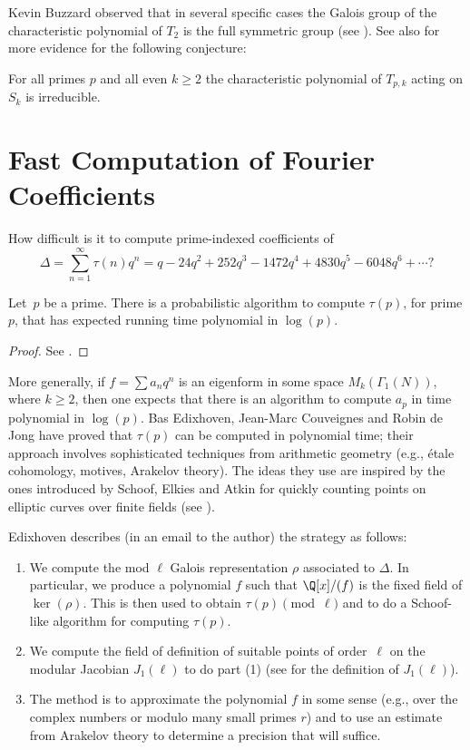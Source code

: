 Kevin Buzzard observed that in several specific cases the Galois group of
the characteristic polynomial of $T_2$ is the full symmetric group
(see \cite{buzzard:t2}).  See also \cite{farmer-james:maeda} for more
evidence for the following conjecture:
\begin{conjecture}
For all primes $p$ and all even $k\geq 2$
the characteristic polynomial of $T_{p,k}$ acting
on $S_k$ is irreducible.
\end{conjecture}



\section{Fast Computation of Fourier Coefficients}\label{sec:fasttau}

How difficult is it to compute prime-indexed coefficients of 
$$
 \Delta = \sum_{n=1}^{\infty} \tau(n) q^n 
   = q - 24q^2 + 252q^3 - 1472q^4 + 4830q^5 - 6048q^6 + \cdots?
$$

\begin{theorem}\label{conj:edixhoven}
  Let~$p$ be a prime.  There is a probabilistic algorithm to compute
  $\tau(p)$, for prime $p$, that has expected running time polynomial
  in $\log(p)$.
\end{theorem}
\begin{proof}
See \cite{edix:tau}.
\end{proof}

More generally, if $f=\sum a_n q^n$ is an eigenform in some space
$M_k(\Gamma_1(N))$, where $k\geq 2$, then one expects that there is an
algorithm to compute $a_p$ in time polynomial in $\log(p)$.  Bas
Edixhoven, Jean-Marc Couveignes and Robin de Jong have proved that
$\tau(p)$ can be computed in polynomial time; their approach involves
sophisticated techniques from arithmetic geometry (e.g., \'etale
cohomology, motives, Arakelov theory). The ideas they use are inspired
by the ones introduced by Schoof, Elkies and Atkin for quickly
counting points on elliptic curves over finite fields (see
\cite{MR1413578}).

Edixhoven describes (in an email to the author) the strategy as follows:
\begin{enumerate}
\item We compute the mod $\ell$ Galois representation $\rho$
  associated to $\Delta$.  In particular, we produce a polynomial $f$
  such that $\Q[x]/(f)$ is the fixed field of $\ker(\rho)$. This is
  then used to obtain $\tau(p) \pmod{\ell}$ and to do a Schoof-like
  algorithm for computing $\tau(p)$.

\item We compute the field of definition of suitable points of
  order~$\ell$ on the modular Jacobian $J_1(\ell)$ to do part (1) (see
  \cite[Ch.~6]{diamond-shurman} for the definition of $J_1(\ell)$).

\item The method is to approximate the polynomial $f$ in some sense
  (e.g., over the complex numbers or modulo many small primes $r$)
  and to use an estimate from Arakelov theory to determine a
  precision that will suffice.
\end{enumerate}

